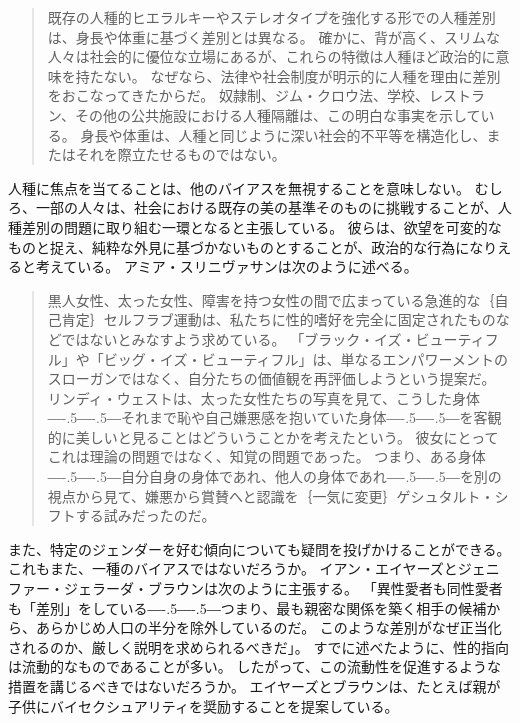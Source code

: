 \documentclass[paper=a4,book,openany]{jlreq}
\newcommand{\ig}[1]{}           %
\def\DDASH{―\kern-.5\zw―\kern-.5\zw―} %
\begin{document}
\begin{quote}
  既存の人種的ヒエラルキーやステレオタイプを強化する形での人種差別は、身長や体重に基づく差別とは異なる。
確かに、背が高く、スリムな人々は社会的に優位な立場にあるが、これらの特徴は人種ほど政治的に意味を持たない。
なぜなら、法律や社会制度が明示的に人種を理由に差別をおこなってきたからだ。
奴隷制、ジム・クロウ法、学校、レストラン、その他の公共施設における人種隔離は、この明白な事実を示している。
身長や体重は、人種と同じように深い社会的不平等を構造化し、またはそれを際立たせるものではない。
\citep[p.1004]{bedi15:_sexual_racis}

\end{quote}

人種に焦点を当てることは、他のバイアスを無視することを意味しない。
むしろ、一部の人々は、社会における既存の美の基準そのものに挑戦することが、人種差別の問題に取り組む一環となると主張している。
彼らは、欲望を可変的なものと捉え、純粋な外見に基づかないものとすることが、政治的な行為になりえると考えている。
アミア・スリニヴァサンは次のように述べる。

\begin{quote}
黒人女性、太った女性、障害を持つ女性の間で広まっている急進的な｛自己肯定｝{セルフラブ}運動は、私たちに性的嗜好を完全に固定されたものなどではないとみなすよう求めている。
「ブラック・イズ・ビューティフル」や「ビッグ・イズ・ビューティフル」は、単なるエンパワーメントのスローガンではなく、自分たちの価値観を再評価しようという提案だ。
リンディ・ウェスト\ig{Lindy West}は、太った女性たちの写真を見て、こうした身体{\DDASH}それまで恥や自己嫌悪感を抱いていた身体{\DDASH}を客観的に美しいと見ることはどういうことかを考えたという。
彼女にとってこれは理論の問題ではなく、知覚の問題であった。
つまり、ある身体{\DDASH}自分自身の身体であれ、他人の身体であれ{\DDASH}を別の視点から見て、嫌悪から賞賛へと認識を｛一気に変更｝{ゲシュタルト・シフト}する試みだったのだ。
\citep{srinivasan18:_does_anyon_have_right_sex}
\end{quote}

また、特定のジェンダーを好む傾向についても疑問を投げかけることができる。
これもまた、一種のバイアスではないだろうか。
イアン・エイヤーズとジェニファー・ジェラーダ・ブラウンは次のように主張する。
「異性愛者も同性愛者も「差別」をしている{\DDASH}つまり、最も親密な関係を築く相手の候補から、あらかじめ人口の半分を除外しているのだ。
このような差別がなぜ正当化されるのか、厳しく説明を求められるべきだ」\citep[p.31]{ayres05:_straig}。
すでに述べたように、性的指向は流動的なものであることが多い。
したがって、この流動性を促進するような措置を講じるべきではないだろうか。
エイヤーズとブラウンは、たとえば親が子供にバイセクシュアリティを奨励することを提案している。
\end{document}
